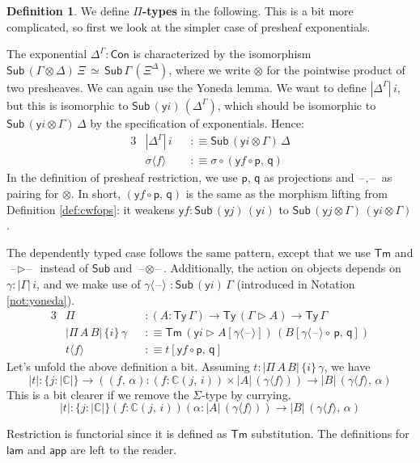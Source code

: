 \documentclass[12pt,a4paper,twoside,openany]{book}
\theoremstyle{remark}
\theoremstyle{definition}
\newtheorem{mydefinition}{Definition}
\newcommand{\ms}[1]{\mathsf{#1}}
\newcommand{\mbb}[1]{\mathbb{#1}}
\newcommand{\Con}{\mathsf{Con}}
\newcommand{\Sub}{\mathsf{Sub}}
\newcommand{\Tm}{\mathsf{Tm}}
\newcommand{\Ty}{\mathsf{Ty}}
\newcommand{\blank}{\mathord{\hspace{1pt}\text{--}\hspace{1pt}}}
\newcommand{\ext}{\triangleright}
\newcommand{\p}{\mathsf{p}}
\newcommand{\q}{\mathsf{q}}
\newcommand{\app}{\ms{app}}
\newcommand{\mbbC}{\mbb{C}}
\newcommand{\lam}{\ms{lam}}
\newcommand{\lab}{\langle}
\newcommand{\rab}{\rangle}
\newcommand{\defn}{:\equiv}
\newcommand{\yon}{\ms{y}}
\begin{document}
\begin{mydefinition}
We define \textbf{$\Pi$-types} in the following. This is a bit more complicated,
so first we look at the simpler case of presheaf exponentials.

The exponential $\Delta^\Gamma : \Con$ is characterized by the isomorphism
$\Sub\,(\Gamma \otimes \Delta)\,\Xi\,\simeq\,\Sub\,\Gamma\,(\Xi^\Delta)$, where
we write $\otimes$ for the pointwise product of two presheaves. We can again use
the Yoneda lemma. We want to define $|\Delta^\Gamma|\,i$, but this is isomorphic
to $\Sub\,(\yon i)\,(\Delta^\Gamma)$, which should be isomorphic to $\Sub\,(\yon
i \otimes \Gamma)\,\Delta$ by the specification of exponentials. Hence:
\begin{alignat*}{3}
  &|\Delta^\Gamma|\,i &&\defn \Sub\,(\yon i \otimes \Gamma)\,\Delta \\
  & \sigma \lab f \rab &&\defn \sigma \circ (\yon f \circ \p,\,\q)
\end{alignat*}
In the definition of presheaf restriction, we use $\p$, $\q$ as projections and
$\blank\!,\!\blank$ as pairing for $\otimes$. In short, $(\yon f \circ \p,\,\q)$
is the same as the morphism lifting from Definition \ref{def:cwfops}: it weakens
$\yon f : \Sub\,(\yon j)\,(\yon i)$ to $\Sub\,(\yon j \otimes \Gamma)\,(\yon i
\otimes \Gamma)$.

The dependently typed case follows the same pattern, except that we use $\Tm$
and $\blank\!\ext\!\blank$ instead of $\Sub$ and
$\blank\!\otimes\!\blank$. Additionally, the action on objects depends on
$\gamma : |\Gamma|\,i$, and we make use of $\gamma \lab \blank \rab\,\,:
\Sub\,(\yon i)\,\Gamma$ (introduced in Notation \ref{not:yoneda}).
\begin{alignat*}{3}
  & \Pi &&: (A : \Ty\,\Gamma) \to \Ty\,(\Gamma \ext A) \to \Ty\,\Gamma\\
  & |\Pi\,A\,B|\,\{i\}\,\gamma &&\defn \Tm\,(\yon i \ext A[\gamma \lab \blank \rab])\,(B[\gamma\lab\blank\rab \circ\,\p,\,\q])\\
  & t\lab f \rab &&\defn t[\yon f \circ \p,\, \q]
\end{alignat*}
Let's unfold the above definition a bit. Assuming $t : |\Pi\,A\,B|\,\{i\}\,\gamma$, we have
\[
|t| : \{j : |\mbbC|\}\to((f,\,\alpha) : (f : \mbbC(j,\,i)) \times |A|\,(\gamma\lab f \rab)) \to
       |B|\,(\gamma\lab f\rab,\,\alpha)
\]
This is a bit clearer if we remove the $\Sigma$-type by currying.
\[
|t| : \{j : |\mbbC|\}(f : \mbbC(j,\,i))(\alpha : |A|\,(\gamma \lab f \rab)) \to
       |B|\,(\gamma\lab f \rab,\,\alpha)
\]

Restriction is functorial since it is defined as $\Tm$ substitution. The definitions
for $\lam$ and $\app$ are left to the reader.
\end{mydefinition}
\end{document}
